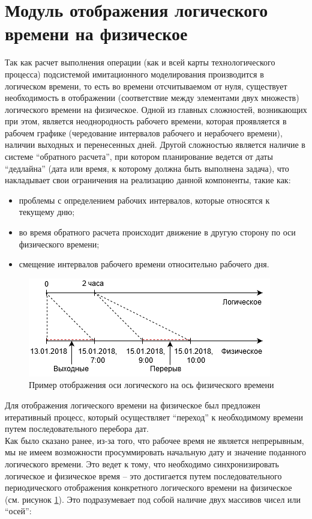 \section{Модуль отображения логического времени на физическое}
\indent Так как расчет выполнения операции (как и всей карты технологического процесса) подсистемой имитационного моделирования производится в логическом времени, то есть во времени отсчитываемом от нуля, существует необходимость в отображении (соответствие между элементами двух множеств) логического времени на физическое.
Одной из главных сложностей, возникающих при этом, является неоднородность рабочего времени, которая проявляется в рабочем графике (чередование интервалов рабочего и нерабочего времени), наличии выходных и перенесенных дней.
Другой сложностью является наличие в системе ``обратного расчета'', при котором планирование ведется от даты ``дедлайна'' (дата или время, к которому должна быть выполнена задача), что накладывает свои ограничения на реализацию данной компоненты, такие как:
\begin{itemize}
	\item проблемы с определением рабочих интервалов, которые относятся к текущему дню;
	\item во время обратного расчета происходит движение в другую сторону по оси физического времени;
	\item смещение интервалов рабочего времени относительно рабочего дня.
\end{itemize}
\begin{figure}[h!]
	\centering
	\includegraphics[width=0.7\linewidth]{pics/scheduleAxes.png}
	\caption{Пример отображения оси логического на ось физического времени}
	\label{fig:axes}
\end{figure}

\indent Для отображения логического времени на физическое был предложен итеративный процесс, который осуществляет ``переход'' к необходимому времени путем последовательного перебора дат.\\
\indent Как было сказано ранее, из-за того, что рабочее время не является непрерывным, мы не имеем возможности просуммировать начальную дату и значение поданного логического времени.
Это ведет к тому, что необходимо синхронизировать логическое и физическое время -- это достигается путем последовательного периодического отображения конкретного логического времени на физическое (см. рисунок \ref{fig:axes}).
Это подразумевает под собой наличие двух массивов чисел или ``осей'':

